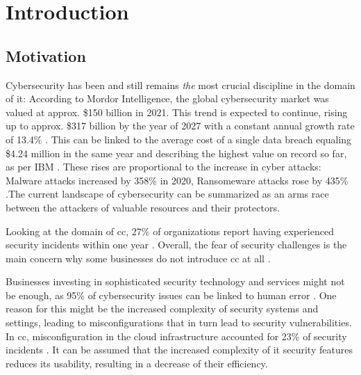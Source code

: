 \chapter{Introduction}
\label{ch:intro}

\section{Motivation} \label{sec:intro-motivation}

Cybersecurity has been and still remains \textit{the} most crucial discipline in the domain of \Ac{it}: According to Mordor Intelligence, the global cybersecurity market was valued at approx. \$150 billion in 2021. This trend is expected to continue, rising up to approx. \$317 billion by the year of 2027 with a constant annual growth rate of 13.4\% \cite{noauthor_cybersecurity_2022}. This can be linked to the average cost of a single data breach equaling \$4.24 million in the same year and describing the highest value on record so far, as per IBM \cite{noauthor_cost_2022}. These rises are proportional to the increase in cyber attacks: Malware attacks increased by 358\% in 2020, Ransomeware attacks rose by 435\% \cite{noauthor_malware_2021}.The current landscape of cybersecurity can be summarized as an arms race between the attackers of valuable resources and their protectors. 

Looking at the domain of \ac{cc}, 27\% of organizations report having experienced security incidents within one year \cite{schulze_cloud_2022}. Overall, the fear of security challenges is the main concern why some businesses do not introduce \ac{cc} at all \cite{noauthor_2021_2021, noauthor_2022_2022}.

Businesses investing in sophisticated security technology and services might not be enough, as 95\% of cybersecurity issues can be linked to human error \cite{mee_after_2020}. One reason for this might be the increased complexity of security systems and settings, leading to misconfigurations that in turn lead to security vulnerabilities. In \ac{cc}, misconfiguration in the cloud infrastructure accounted for 23\% of security incidents \cite{schulze_cloud_2022}. It can be assumed that the increased complexity of \ac{it} security features reduces its usability, resulting in a decrease of their efficiency.

